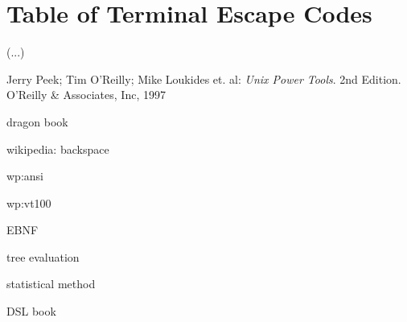 \documentclass[paper=a4,twoside,abstract=on,cleardoublepage=empty,numbers=noenddot,toc=bib,12pt]{scrreprt}
\begin{document}
\chapter{Table of Terminal Escape Codes}

(...)

\begin{thebibliography}{99}
    \bibitem{}
        Jerry Peek; Tim O'Reilly; Mike Loukides et. al: \emph{Unix Power Tools}. 2nd Edition. O'Reilly \& Associates, Inc, 1997

    \bibitem{}
        dragon book

    \bibitem{}
        wikipedia: backspace

    \bibitem{}
        wp:ansi

    \bibitem{}
        wp:vt100

    \bibitem{}
        EBNF

    \bibitem{}
        tree evaluation

    \bibitem{}
        statistical method

    \bibitem{}
        DSL book
\end{thebibliography}
\end{document}

